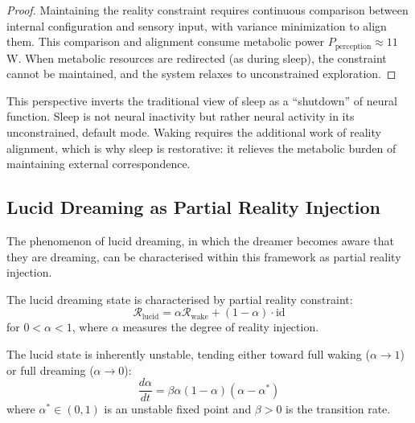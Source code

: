 \begin{proof}
Maintaining the reality constraint requires continuous comparison between internal configuration and sensory input, with variance minimization to align them. This comparison and alignment consume metabolic power $P_{\text{perception}} \approx 11$ W. When metabolic resources are redirected (as during sleep), the constraint cannot be maintained, and the system relaxes to unconstrained exploration.
\end{proof}

This perspective inverts the traditional view of sleep as a ``shutdown'' of neural function. Sleep is not neural inactivity but rather neural activity in its unconstrained, default mode. Waking requires the additional work of reality alignment, which is why sleep is restorative: it relieves the metabolic burden of maintaining external correspondence.

\subsection{Lucid Dreaming as Partial Reality Injection}

The phenomenon of lucid dreaming, in which the dreamer becomes aware that they are dreaming, can be characterised within this framework as partial reality injection.

\begin{definition}
\label{def:lucid}
The lucid dreaming state is characterised by partial reality constraint:
\begin{equation}
\mathcal{R}_{\text{lucid}} = \alpha \mathcal{R}_{\text{wake}} + (1 - \alpha) \cdot \text{id}
\label{eq:lucid_constraint}
\end{equation}
for $0 < \alpha < 1$, where $\alpha$ measures the degree of reality injection.
\end{definition}

\begin{theorem}
\label{thm:lucid_instability}
The lucid state is inherently unstable, tending either toward full waking ($\alpha \rightarrow 1$) or full dreaming ($\alpha \rightarrow 0$):
\begin{equation}
\frac{d\alpha}{dt} = \beta \alpha (1 - \alpha)(\alpha - \alpha^*)
\label{eq:lucid_dynamics}
\end{equation}
where $\alpha^* \in (0, 1)$ is an unstable fixed point and $\beta > 0$ is the transition rate.
\end{theorem}

